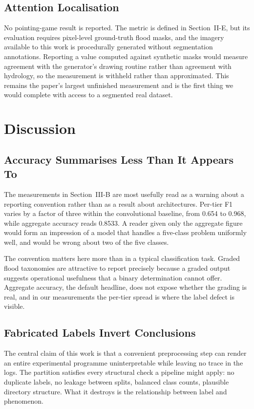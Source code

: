 \documentclass[11pt,journal]{IEEEtran}
\begin{document}
\subsection{Attention Localisation}

No pointing-game result is reported. The metric is defined in Section~II-E,
but its evaluation requires pixel-level ground-truth flood masks, and the
imagery available to this work is procedurally generated without segmentation
annotations. Reporting a value computed against synthetic masks would measure
agreement with the generator's drawing routine rather than agreement with
hydrology, so the measurement is withheld rather than approximated. This
remains the paper's largest unfinished measurement and is the first thing we
would complete with access to a segmented real dataset.

\section{Discussion}
\label{sec:discussion}

\subsection{Accuracy Summarises Less Than It Appears To}

The measurements in Section~III-B are most usefully read as a warning about a
reporting convention rather than as a result about architectures. Per-tier F1
varies by a factor of three within the convolutional baseline, from 0.654 to
0.968, while aggregate accuracy reads 0.8533. A reader given only the aggregate
figure would form an impression of a model that handles a five-class problem
uniformly well, and would be wrong about two of the five classes.

The convention matters here more than in a typical classification task. Graded
flood taxonomies are attractive to report precisely because a graded output
suggests operational usefulness that a binary determination cannot offer.
Aggregate accuracy, the default headline, does not expose whether the grading is
real, and in our measurements the per-tier spread is where the label defect is
visible.

\subsection{Fabricated Labels Invert Conclusions}

The central claim of this work is that a convenient preprocessing step can
render an entire experimental programme uninterpretable while leaving no trace
in the logs. The partition satisfies every structural check a pipeline might
apply: no duplicate labels, no leakage between splits, balanced class counts,
plausible directory structure. What it destroys is the relationship between
label and phenomenon.
\end{document}

